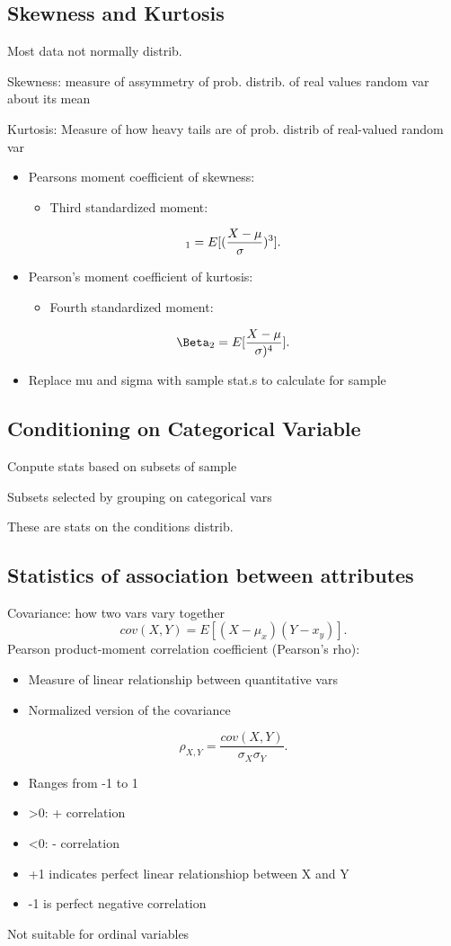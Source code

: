 \documentclass[a4paper]{article}
\begin{document}
\subsection{Skewness and Kurtosis}
Most data not normally distrib.
\par Skewness: measure of assymmetry of prob. distrib. of real values random var
about its mean
\par Kurtosis: Measure of how heavy tails are of prob. distrib of real-valued
random var
\begin{itemize}
	\item Pearsons moment coefficient of skewness:
	\begin{itemize}
		\item Third standardized moment:
	\end{itemize}
\end{itemize}
\[
	_1 = E[(\frac{X-\mu}{\sigma \\})^3]
.\]
\begin{itemize}
	\item Pearson's moment coefficient of kurtosis:
	\begin{itemize}
		\item Fourth standardized moment:
	\end{itemize}
\end{itemize}
\[
	\Beta_2 = E[\frac{X-\mu}{\sigma)^{4}}]
.\]
\begin{itemize}
	\item Replace mu and sigma with sample stat.s to calculate for sample
\end{itemize}
\subsection{Conditioning on Categorical Variable}
Conpute stats based on subsets of sample
\par Subsets selected by grouping on categorical vars
\par These are stats on the conditions distrib.
\subsection{Statistics of association between attributes}
Covariance: how two vars vary together
\[
	cov(X,Y)=E[(X-\mu_x)(Y-x_y)]
.\]
Pearson product-moment correlation coefficient (Pearson's rho):
\begin{itemize}
	\item Measure of linear relationship between quantitative vars
	\item Normalized version of the covariance
\end{itemize}
\[
	\rho_{X,Y}=\frac{cov(X,Y)}{\sigma_X\sigma_Y}
.\]
\begin{itemize}
	\item Ranges from -1 to 1
	\item >0: + correlation
	\item <0: - correlation
	\item +1 indicates perfect linear relationshiop between X and Y
	\item -1 is perfect negative correlation
\end{itemize}
Not suitable for ordinal variables
\end{document}
